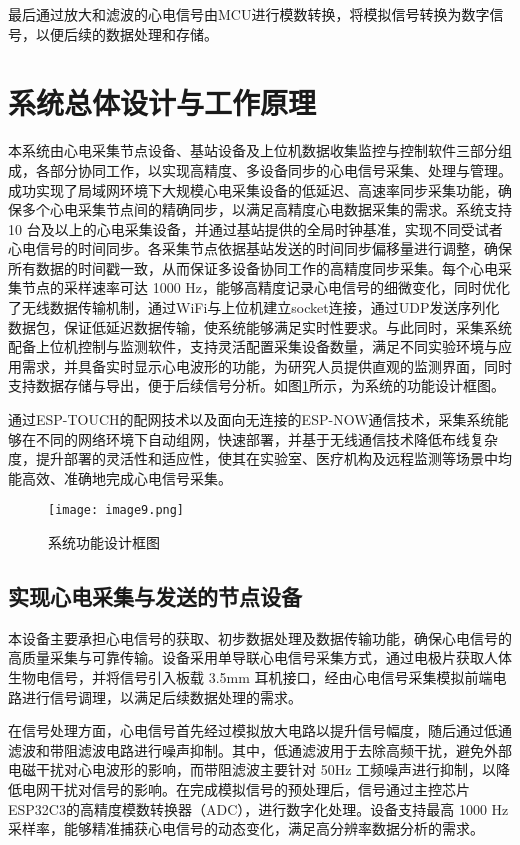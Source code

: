 最后通过放大和滤波的心电信号由MCU进行模数转换，将模拟信号转换为数字信号，以便后续的数据处理和存储。

\newpage    %


\section{系统总体设计与工作原理}

本系统由心电采集节点设备、基站设备及上位机数据收集监控与控制软件三部分组成，各部分协同工作，以实现高精度、多设备同步的心电信号采集、处理与管理。成功实现了局域网环境下大规模心电采集设备的低延迟、高速率同步采集功能，确保多个心电采集节点间的精确同步，以满足高精度心电数据采集的需求。系统支持 10 台及以上的心电采集设备，并通过基站提供的全局时钟基准，实现不同受试者心电信号的时间同步。各采集节点依据基站发送的时间同步偏移量进行调整，确保所有数据的时间戳一致，从而保证多设备协同工作的高精度同步采集。每个心电采集节点的采样速率可达 1000 Hz，能够高精度记录心电信号的细微变化，同时优化了无线数据传输机制，通过WiFi与上位机建立socket连接，通过UDP发送序列化数据包，保证低延迟数据传输，使系统能够满足实时性要求。与此同时，采集系统配备上位机控制与监测软件，支持灵活配置采集设备数量，满足不同实验环境与应用需求，并具备实时显示心电波形的功能，为研究人员提供直观的监测界面，同时支持数据存储与导出，便于后续信号分析。如图\ref{F.ECG_image9}所示，为系统的功能设计框图。

通过ESP-TOUCH的配网技术以及面向无连接的ESP-NOW通信技术，采集系统能够在不同的网络环境下自动组网，快速部署，并基于无线通信技术降低布线复杂度，提升部署的灵活性和适应性，使其在实验室、医疗机构及远程监测等场景中均能高效、准确地完成心电信号采集。

\begin{figure}[hbt]
    \centering
    \texttt{[image: image9.png]}
    \caption{系统功能设计框图}
    \label{F.ECG_image9}
\end{figure}

\subsection{实现心电采集与发送的节点设备}

本设备主要承担心电信号的获取、初步数据处理及数据传输功能，确保心电信号的高质量采集与可靠传输。设备采用单导联心电信号采集方式，通过电极片获取人体生物电信号，并将信号引入板载 3.5mm 耳机接口，经由心电信号采集模拟前端电路进行信号调理，以满足后续数据处理的需求。

在信号处理方面，心电信号首先经过模拟放大电路以提升信号幅度，随后通过低通滤波和带阻滤波电路进行噪声抑制。其中，低通滤波用于去除高频干扰，避免外部电磁干扰对心电波形的影响，而带阻滤波主要针对 50Hz 工频噪声进行抑制，以降低电网干扰对信号的影响。在完成模拟信号的预处理后，信号通过主控芯片ESP32C3的高精度模数转换器（ADC），进行数字化处理。设备支持最高 1000 Hz 采样率，能够精准捕获心电信号的动态变化，满足高分辨率数据分析的需求。

